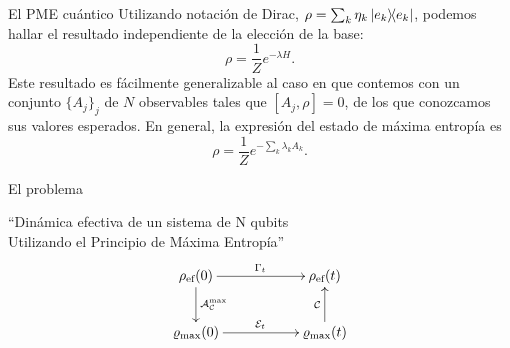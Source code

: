 \begin{frame}{El PME cuántico}
    Utilizando notación de Dirac, $\rho=\sum_{k}\eta_{k}\dyad{e_{k}}$, podemos hallar el resultado independiente de la elección de la base:
    \begin{equation}
        \rho=\frac{1}{Z}e^{-\lambda H}.\nonumber
    \end{equation}
    Este resultado es fácilmente generalizable al caso en que contemos con un  conjunto $\{A_{j}\}_{j}$ de $N$ observables tales que $[A_{j},\rho]=0$, de los que conozcamos sus valores esperados. En general, la expresión del estado de máxima entropía es
    \begin{equation}\label{eq:GeneralMaxEnt}
        \rho=\frac{1}{Z}e^{-\sum_{k}\lambda_{k} A_{k}}.\nonumber
    \end{equation}
\end{frame}


\begin{frame}{El problema}
    \begin{center}
        ``Dinámica efectiva de un sistema de N qubits\\
        Utilizando el Principio de Máxima Entropía''
        \begin{displaymath}
            \xymatrix{
              {\rho_{\ef}(0)} \ar[rr]^{\Gamma_{t}} \ar[d]^{\mcA_{\mcC}^{\max}}
              && {\rho_{\ef}(t)}\\
              {\varrho_{\max}(0)} \ar[rr]^{\mcE_{t}}
              && {\varrho_{\max}(t)} \ar[u]^{\mcC}
            }
          \end{displaymath}
    \end{center}
\end{frame}